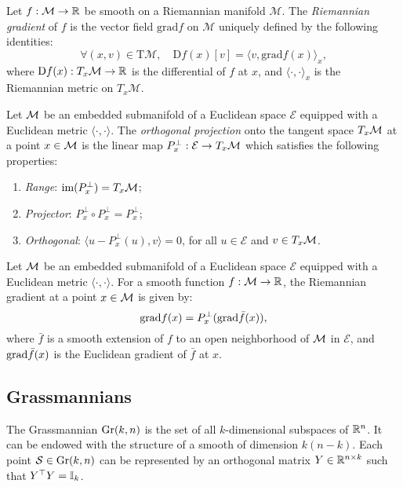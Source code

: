 \begin{definition}
    Let $f : \mathcal{M} \to \mathbb{R}$ be smooth on a Riemannian manifold $\mathcal{M}$. The \textit{Riemannian gradient} of $f$ is the vector field $\textrm{grad}f$ on $\mathcal{M}$ uniquely defined by the following identities:
    \[
        \forall (x,v) \in \textrm{T}\mathcal{M}, \quad \textrm{D}f(x)[v] = \langle v, \textrm{grad}f(x) \rangle_x,
    \]
    where $\textrm{D}f(x) : T_x \mathcal{M} \to \mathbb{R}$ is the differential of $f$ at $x$, and $\langle \cdot, \cdot \rangle_x$ is the Riemannian metric on $T_x \mathcal{M}$.
\end{definition}

\begin{definition}[Projection]
    Let $\mathcal{M}$ be an embedded submanifold of a Euclidean space $\mathcal{E}$ equipped with a Euclidean metric $\langle \cdot, \cdot \rangle$. The \textit{orthogonal projection} onto the tangent space $T_x \mathcal{M}$ at a point $x \in \mathcal{M}$ is the linear map $P^{\perp}_x : \mathcal{E} \to T_x \mathcal{M}$ which satisfies the following properties:
    \begin{enumerate}
        \item \emph{Range}: $\textrm{im}(P^{\perp}_x) = T_x \mathcal{M}$;
        \item \emph{Projector}: $P^{\perp}_x \circ P^{\perp}_x = P^{\perp}_x$;
        \item \emph{Orthogonal}: $\langle u - P^{\perp}_x(u), v \rangle = 0$, for all $u \in \mathcal{E}$ and $v \in T_x \mathcal{M}$.
    \end{enumerate}
    
\end{definition}

\begin{lemma}\label{prop:riem_grad}
    Let $\mathcal{M}$ be an embedded submanifold of a Euclidean space $\mathcal{E}$ equipped with a Euclidean metric $\langle \cdot, \cdot \rangle$. For a smooth function $f : \mathcal{M} \to \mathbb{R}$, the Riemannian gradient at a point $x \in \mathcal{M}$ is given by:
    \[
        \textrm{grad}f(x) = P^{\perp}_x(\mathrm{grad }{\bar{f}}(x)),
    \]
    where $\bar{f}$ is a smooth extension of $f$ to an open neighborhood of $\mathcal{M}$ in $\mathcal{E}$, and $\mathrm{grad }{\bar{f}}(x)$ is the Euclidean gradient of $\bar{f}$ at $x$.
\end{lemma}

\subsection{Grassmannians}
The Grassmannian $\text{Gr}(k,n)$ is the set of all $k$-dimensional subspaces of $\mathbb{R}^n$. It can be endowed with the structure of a smooth  of dimension $k(n-k)$. Each point $\mathcal{S} \in \text{Gr}(k,n)$ can be represented by an orthogonal matrix $Y \in \mathbb{R}^{n \times k}$ such that $Y^\top Y = \mathbb{I}_k$.

